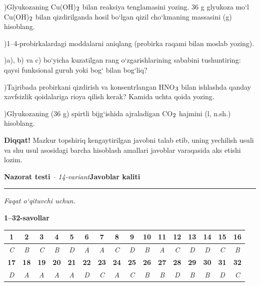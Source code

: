 \documentclass[11pt,a4paper]{article}
\renewcommand{\textsubscript}[1]{\ensuremath{_{\text{\fontsize{8}{8}\selectfont #1}}}}
\newcommand{\qsep}{\par\vspace{1pt}\noindent\rule{0pt}{0.4pt}\par\vspace{5pt}}
\newcommand{\diqqat}[1]{\par\smallskip\noindent\textbf{Diqqat!} #1\par\medskip}
\begin{document}
)Glyukozaning Cu(OH)\textsubscript{2} bilan reaksiya tenglamasini yozing. 36 g glyukoza mo`l Cu(OH)\textsubscript{2} bilan qizdirilganda hosil bo`lgan qizil cho`kmaning massasini (g) hisoblang.\par
{})1--4-probirkalardagi moddalarni aniqlang (probirka raqami bilan moslab yozing).\par
{})a), b) va c) bo`yicha kuzatilgan rang o`zgarishlarining sababini tushuntiring: qaysi funksional guruh yoki bog` bilan bog`liq?\par
{})Tajribada probirkani qizdirish va konsentrlangan HNO\textsubscript{3} bilan ishlashda qanday xavfsizlik qoidalariga rioya qilish kerak? Kamida uchta qoida yozing.\par
{})Glyukozaning (36 g) spirtli bijg`ishida ajraladigan CO\textsubscript{2} hajmini (l, n.sh.) hisoblang.\par
\diqqat{Mazkur topshiriq kengaytirilgan javobni talab etib, uning yechilish usuli va shu usul asosidagi barcha hisoblash amallari javoblar varaqasida aks etishi lozim.}\qsep
\newpage
\noindent\textbf{\fontsize{13}{15}\selectfont Nazorat testi}\ \textit{$\cdot$ 14-variant}\hfill \textbf{Javoblar kaliti}\par\smallskip\hrule\smallskip
\textit{Faqat o`qituvchi uchun.}\par\medskip
\noindent\textbf{1--32-savollar}\par\smallskip
\noindent\begin{tabular}{|c|c|c|c|c|c|c|c|c|c|c|c|c|c|c|c|}\hline
\textbf{1} & \textbf{2} & \textbf{3} & \textbf{4} & \textbf{5} & \textbf{6} & \textbf{7} & \textbf{8} & \textbf{9} & \textbf{10} & \textbf{11} & \textbf{12} & \textbf{13} & \textbf{14} & \textbf{15} & \textbf{16}\\\hline
\textsl{C} & \textsl{B} & \textsl{C} & \textsl{B} & \textsl{D} & \textsl{A} & \textsl{A} & \textsl{C} & \textsl{D} & \textsl{B} & \textsl{A} & \textsl{C} & \textsl{D} & \textsl{D} & \textsl{C} & \textsl{B}\\\hline
\textbf{17} & \textbf{18} & \textbf{19} & \textbf{20} & \textbf{21} & \textbf{22} & \textbf{23} & \textbf{24} & \textbf{25} & \textbf{26} & \textbf{27} & \textbf{28} & \textbf{29} & \textbf{30} & \textbf{31} & \textbf{32}\\\hline
\textsl{D} & \textsl{A} & \textsl{A} & \textsl{A} & \textsl{A} & \textsl{D} & \textsl{C} & \textsl{A} & \textsl{C} & \textsl{B} & \textsl{B} & \textsl{D} & \textsl{B} & \textsl{B} & \textsl{D} & \textsl{C}\\\hline
\end{tabular}\par\medskip
\end{document}
